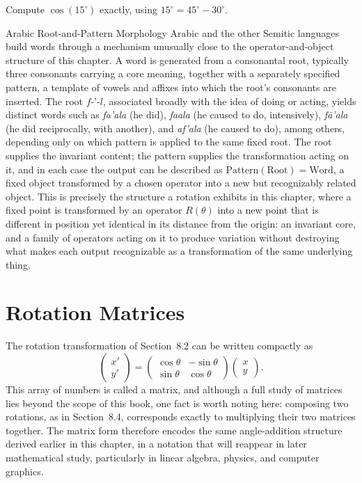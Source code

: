 \begin{practicenow}
Compute $\cos(15^\circ)$ exactly, using $15^\circ = 45^\circ - 30^\circ$.
\end{practicenow}

\begin{sidebar}{Arabic Root-and-Pattern Morphology}
Arabic and the other Semitic languages build words through a mechanism
unusually close to the operator-and-object structure of this chapter. A
word is generated from a consonantal root, typically three consonants
carrying a core meaning, together with a separately specified pattern, a
template of vowels and affixes into which the root's consonants are
inserted. The root $f$-$\text{'}$-$l$, associated broadly with the idea
of doing or acting, yields distinct words such as \textit{fa'ala} (he
did), \textit{faala} (he caused to do, intensively),
\textit{f\={a}'ala} (he did reciprocally, with another), and
\textit{af'ala} (he caused to do), among others, depending only on which
pattern is applied to the same fixed root. The root supplies the
invariant content; the pattern supplies the transformation acting on it,
and in each case the output can be described as
$\text{Pattern}(\text{Root}) = \text{Word}$, a fixed object transformed
by a chosen operator into a new but recognizably related object. This is
precisely the structure a rotation exhibits in this chapter, where a
fixed point is transformed by an operator $R(\theta)$ into a new point
that is different in position yet identical in its distance from the
origin: an invariant core, and a family of operators acting on it to
produce variation without destroying what makes each output recognizable
as a transformation of the same underlying thing.
\end{sidebar}

\section{Rotation Matrices}

The rotation transformation of Section~8.2 can be written compactly as
\[
\begin{pmatrix} x' \\ y' \end{pmatrix}
=
\begin{pmatrix} \cos\theta & -\sin\theta \\ \sin\theta & \cos\theta \end{pmatrix}
\begin{pmatrix} x \\ y \end{pmatrix}.
\]
This array of numbers is called a matrix, and although a full study of
matrices lies beyond the scope of this book, one fact is worth noting here:
composing two rotations, as in Section~8.4, corresponds exactly to
multiplying their two matrices together. The matrix form therefore encodes
the same angle-addition structure derived earlier in this chapter, in a
notation that will reappear in later mathematical study, particularly in
linear algebra, physics, and computer graphics.

